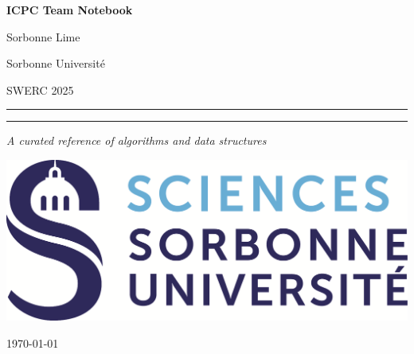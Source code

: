 \documentclass[10pt,a4paper]{article}
\begin{document}
\begin{titlepage}
  \centering

  \vspace*{2cm}
  {\Huge\bfseries ICPC Team Notebook\par}
  \vspace{1cm}

  {\Large {Sorbonne Lime}\par}
  {\Large {Sorbonne Université}\par}
  {\Large SWERC 2025\par}
  \vspace{1.5cm}

  \rule{\linewidth}{1.5pt}\par
  \vspace{0.5cm}
  \rule{\linewidth}{0.5pt}\par
  \vspace{1.5cm}

  {\LARGE \itshape A curated reference of algorithms and data structures\par}
  \vspace{1cm}

  \includegraphics[width=0.2 \textwidth]{img/logo.png}\par
  \vspace{1cm}

  {\large \today\par}

  \clearpage
\end{titlepage}


\clearpage
\tableofcontents

\twocolumn

\end{document}

